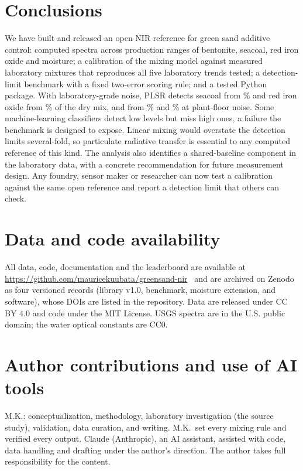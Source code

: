 \documentclass[10pt,twocolumn,letterpaper]{article}
\begin{document}
\section{Conclusions}\label{sec:conclusions}

We have built and released an open NIR reference for green sand additive control: \nTotal{} computed spectra across production ranges of bentonite, seacoal, red iron oxide and moisture; a calibration of the mixing model against measured laboratory mixtures that reproduces all five laboratory trends tested; a detection-limit benchmark with a fixed two-error scoring rule; and a tested Python package. With laboratory-grade noise, PLSR detects seacoal from \lodScDryLab\% and red iron oxide from \lodFeDryLab\% of the dry mix, and from \lodScDryPlant\% and \lodFeDryPlant\% at plant-floor noise. Some machine-learning classifiers detect low levels but miss high ones, a failure the benchmark is designed to expose. Linear mixing would overstate the detection limits several-fold, so particulate radiative transfer is essential to any computed reference of this kind. The analysis also identifies a shared-baseline component in the laboratory data, with a concrete recommendation for future measurement design. Any foundry, sensor maker or researcher can now test a calibration against the same open reference and report a detection limit that others can check.

\section*{Data and code availability}

All data, code, documentation and the leaderboard are available at \url{https://github.com/mauricekuubata/greensand-nir}~\cite{greensandnir} and are archived on Zenodo as four versioned records (library v1.0, benchmark, moisture extension, and software), whose DOIs are listed in the repository. Data are released under CC BY 4.0 and code under the MIT License. USGS spectra are in the U.S. public domain; the water optical constants are CC0.

\section*{Author contributions and use of AI tools}

M.K.: conceptualization, methodology, laboratory investigation (the source study), validation, data curation, and writing. M.K.\ set every mixing rule and verified every output. Claude (Anthropic), an AI assistant, assisted with code, data handling and drafting under the author's direction. The author takes full responsibility for the content.
\end{document}
